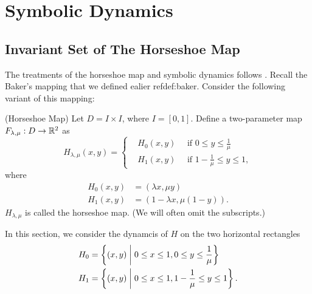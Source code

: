 \documentclass[12pt,twoside]{book}
\begin{document}
\chapter{Symbolic Dynamics}
\section{Invariant Set of The Horseshoe Map}
The treatments of the horseshoe map and symbolic dynamics follows \citet{wiggins}.
Recall the Baker's mapping that we defined ealier ref{def:baker}.
Consider the following variant of this mapping:
\begin{definition}
  (Horseshoe Map)
  Let $D = I \times I$, where $I = [0,1]$.
  Define a two-parameter map $F_{\lambda, \mu}: D \to \mathbb{R}^2$ as
  \begin{equation*}
    H_{\lambda, \mu}(x,y) =
    \begin{cases}
      &H_0(x,y) \quad\mbox{ if } 0 \leq y \leq \frac{1}{\mu}   \\
      &H_1(x,y) \quad\mbox{ if } 1 - \frac{1}{\mu} \leq y \leq 1,
    \end{cases}
  \end{equation*}
  where
  \begin{align*}
    H_0(x,y) &= (\lambda x, \mu y)  \\
    H_1(x,y) &= (1 - \lambda x, \mu(1 - y)).
  \end{align*}
  $H_{\lambda, \mu}$ is called the horseshoe map.
  (We will often omit the subscripts.)
\end{definition}
In this section, we consider the dynamcis of $H$ on the two horizontal rectangles 
\begin{align*}
  H_0 &= \left \{ (x,y) \mathrel{} \middle| \mathrel{}  0 \leq x \leq 1, 0 \leq y \leq \frac{1}{\mu} \right \}  \\
  H_1 &= \left \{ (x,y) \mathrel{} \middle| \mathrel{}  0 \leq x \leq 1, 1 - \frac{1}{\mu} \leq y \leq 1 \right \}.
\end{align*}
\end{document}
